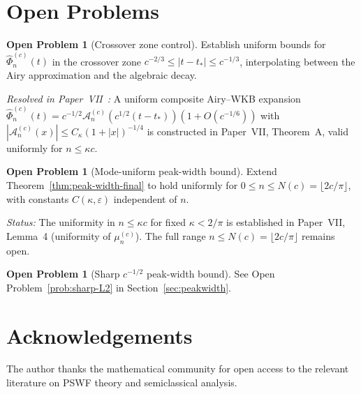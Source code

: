 \documentclass[12pt,a4paper]{amsart}
\theoremstyle{definition}
\newtheorem{problem}[theorem]{Open Problem}
\theoremstyle{remark}
\begin{document}
\section{Open Problems}
\label{sec:open}

\begin{problem}[Crossover zone control]
\label{prob:crossover}
Establish uniform bounds for $\widehat\Phi_n^{(c)}(t)$
in the crossover zone $c^{-2/3} \le |t-t_*| \le c^{-1/3}$,
interpolating between the Airy approximation and the algebraic decay.

\emph{Resolved in Paper~VII~\cite{PaperVII}:}
A uniform composite Airy--WKB expansion
$\widehat\Phi_n^{(c)}(t) = c^{-1/2}\mathcal{A}_n^{(c)}(c^{1/2}(t-t_*))(1+O(c^{-1/6}))$
with $|\mathcal{A}_n^{(c)}(x)| \le C_\kappa(1+|x|)^{-1/4}$
is constructed in Paper~VII, Theorem~A,
valid uniformly for $n \le \kappa c$.
\end{problem}

\begin{problem}[Mode-uniform peak-width bound]
\label{prob:mode-uniform}
Extend Theorem~\ref{thm:peak-width-final} to hold uniformly for
$0 \le n \le N(c) = \lfloor 2c/\pi \rfloor$, with constants
$C(\kappa,\varepsilon)$ independent of $n$.

\emph{Status:} The uniformity in $n \le \kappa c$ for fixed $\kappa < 2/\pi$
is established in Paper~VII, Lemma~4 (uniformity of $\mu_n^{(c)}$).
The full range $n \le N(c) = \lfloor 2c/\pi \rfloor$ remains open.
\end{problem}

\begin{problem}[Sharp $c^{-1/2}$ peak-width bound]
\label{prob:sharp-L2-sec6}
See Open Problem~\ref{prob:sharp-L2} in Section~\ref{sec:peakwidth}.
\end{problem}

\section*{Acknowledgements}

The author thanks the mathematical community for open access to
the relevant literature on PSWF theory and semiclassical analysis.
\end{document}
